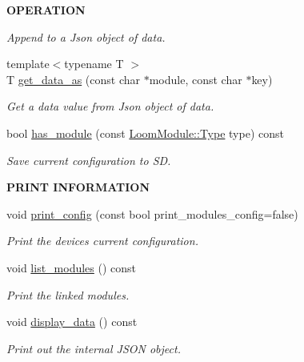 \begin{Indent}{\bf O\+P\+E\+R\+A\+T\+I\+ON}
\begin{DoxyCompactItemize}
\begin{DoxyCompactList}\small\item\em Append to a Json object of data. \end{DoxyCompactList}\item 
{\footnotesize template$<$typename T $>$ }\\T \hyperlink{class_loom_manager_ace28cae7092408bc96bf66299e4c2f9a}{get\+\_\+data\+\_\+as} (const char $\ast$module, const char $\ast$key)
\begin{DoxyCompactList}\small\item\em Get a data value from Json object of data. \end{DoxyCompactList}\item 
bool \hyperlink{class_loom_manager_a2c8c03e61c5ea0e2d1d86c48179accff}{has\+\_\+module} (const \hyperlink{class_loom_module_aee91d0a75140d51ee428fc2d4417d865}{Loom\+Module\+::\+Type} type) const 
\begin{DoxyCompactList}\small\item\em Save current configuration to SD. \end{DoxyCompactList}\end{DoxyCompactItemize}
\end{Indent}
\begin{Indent}{\bf P\+R\+I\+NT I\+N\+F\+O\+R\+M\+A\+T\+I\+ON}\par
\begin{DoxyCompactItemize}
\item 
void \hyperlink{class_loom_manager_a3dcf9e19b7d583aca8a01cfe9f6ba897}{print\+\_\+config} (const bool print\+\_\+modules\+\_\+config=false)
\begin{DoxyCompactList}\small\item\em Print the devices current configuration. \end{DoxyCompactList}\item 
void \hyperlink{class_loom_manager_a0c849e257dfa2a1796daea93d0da6f58}{list\+\_\+modules} () const 
\begin{DoxyCompactList}\small\item\em Print the linked modules. \end{DoxyCompactList}\item 
void \hyperlink{class_loom_manager_a70e8fbf86b96fd3246c2d4422d91139d}{display\+\_\+data} () const 
\begin{DoxyCompactList}\small\item\em Print out the internal J\+S\+ON object. \end{DoxyCompactList}\end{DoxyCompactItemize}
\end{Indent}
